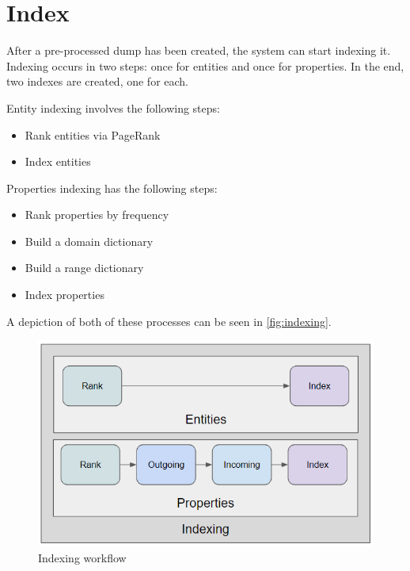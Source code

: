 
\section{Index}

After a pre-processed dump has been created, the system can start indexing it. 
Indexing occurs in two steps: once for entities and once for properties. In the end, two indexes are created, one for each.

Entity indexing involves the following steps:
\begin{itemize}
    \item Rank entities via PageRank
    \item Index entities
\end{itemize}

Properties indexing has the following steps:
\begin{itemize}
    \item Rank properties by frequency
    \item Build a domain dictionary
    \item Build a range dictionary
    \item Index properties
\end{itemize}

A depiction of both of these processes can be seen in \autoref{fig:indexing}.

\begin{figure}[H]
    \centering
        \includegraphics[width=0.7\linewidth]{imagenes/Indexing.png}
        \caption{Indexing workflow}
        \label{fig:indexing}
\end{figure}

